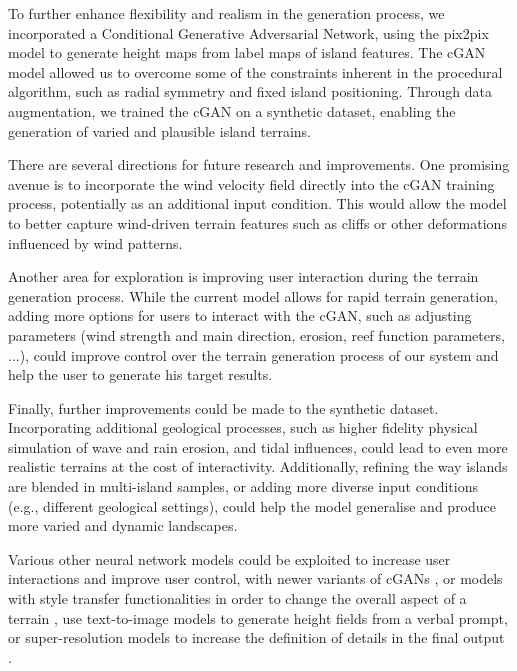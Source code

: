 To further enhance flexibility and realism in the generation process, we incorporated a Conditional Generative Adversarial Network, using the pix2pix model to generate height maps from label maps of island features. The cGAN model allowed us to overcome some of the constraints inherent in the procedural algorithm, such as radial symmetry and fixed island positioning. Through data augmentation, we trained the cGAN on a synthetic dataset, enabling the generation of varied and plausible island terrains.


There are several directions for future research and improvements. One promising avenue is to incorporate the wind velocity field directly into the cGAN training process, potentially as an additional input condition. This would allow the model to better capture wind-driven terrain features such as cliffs or other deformations influenced by wind patterns.

Another area for exploration is improving user interaction during the terrain generation process. While the current model allows for rapid terrain generation, adding more options for users to interact with the cGAN, such as adjusting parameters (wind strength and main direction, erosion, reef function parameters, ...), could improve control over the terrain generation process of our system and help the user to generate his target results.

Finally, further improvements could be made to the synthetic dataset. Incorporating additional geological processes, such as higher fidelity physical simulation of wave and rain erosion, and tidal influences, could lead to even more realistic terrains at the cost of interactivity. Additionally, refining the way islands are blended in multi-island samples, or adding more diverse input conditions (e.g., different geological settings), could help the model generalise and produce more varied and dynamic landscapes.

Various other neural network models could be exploited to increase user interactions and improve user control, with newer variants of cGANs \cite{Park2019}, or models with style transfer functionalities \cite{Gatys2015,Zhu2020} in order to change the overall aspect of a terrain \cite{Perche2023a,Perche2023b}, use text-to-image models \cite{Rombach2021,Radford2021} to generate height fields from a verbal prompt, or super-resolution models \cite{Dong2014} to increase the definition of details in the final output \cite{Guerin2016a}.

